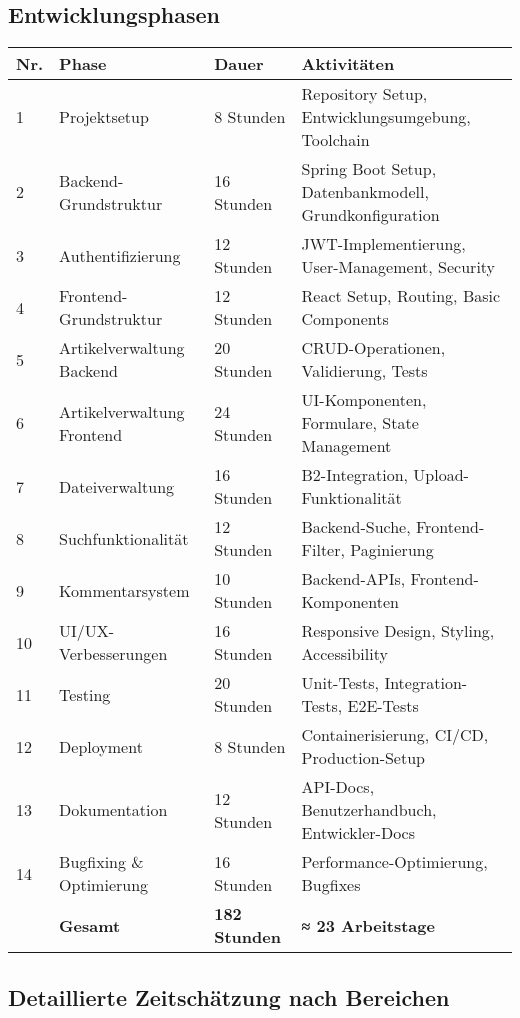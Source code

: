 \documentclass[a4paper,12pt]{article}
\begin{document}
\subsection{Entwicklungsphasen}
\begin{longtable}{|p{}|p{}|p{}|p{}|}
\hline
\textbf{Nr.} & \textbf{Phase} & \textbf{Dauer} & \textbf{Aktivitäten} \\
\hline
1 & Projektsetup & 8 Stunden & Repository Setup, Entwicklungsumgebung, Toolchain \\
\hline
2 & Backend-Grundstruktur & 16 Stunden & Spring Boot Setup, Datenbankmodell, Grundkonfiguration \\
\hline
3 & Authentifizierung & 12 Stunden & JWT-Implementierung, User-Management, Security \\
\hline
4 & Frontend-Grundstruktur & 12 Stunden & React Setup, Routing, Basic Components \\
\hline
5 & Artikelverwaltung Backend & 20 Stunden & CRUD-Operationen, Validierung, Tests \\
\hline
6 & Artikelverwaltung Frontend & 24 Stunden & UI-Komponenten, Formulare, State Management \\
\hline
7 & Dateiverwaltung & 16 Stunden & B2-Integration, Upload-Funktionalität \\
\hline
8 & Suchfunktionalität & 12 Stunden & Backend-Suche, Frontend-Filter, Paginierung \\
\hline
9 & Kommentarsystem & 10 Stunden & Backend-APIs, Frontend-Komponenten \\
\hline
10 & UI/UX-Verbesserungen & 16 Stunden & Responsive Design, Styling, Accessibility \\
\hline
11 & Testing & 20 Stunden & Unit-Tests, Integration-Tests, E2E-Tests \\
\hline
12 & Deployment & 8 Stunden & Containerisierung, CI/CD, Production-Setup \\
\hline
13 & Dokumentation & 12 Stunden & API-Docs, Benutzerhandbuch, Entwickler-Docs \\
\hline
14 & Bugfixing \& Optimierung & 16 Stunden & Performance-Optimierung, Bugfixes \\
\hline
& \textbf{Gesamt} & \textbf{182 Stunden} & \textbf{≈ 23 Arbeitstage} \\
\hline
\end{longtable}

\subsection{Detaillierte Zeitschätzung nach Bereichen}
\end{document}
